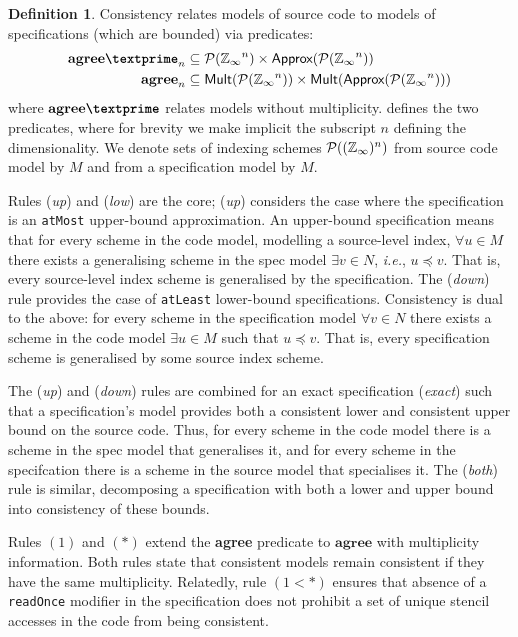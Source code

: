 \documentclass[10pt,preprint,numbers]{sigplanconf}
\newcounter{block}
\theoremstyle{definition}
\newtheorem{definition}[block]{Definition}
\newcommand{\ie}{\emph{i.e.}}
\newcommand{\term}[1]{\texttt{#1}}
\newcommand{\consName}{\textbf{agree\textprime}}
\newcommand{\consAName}{\textbf{agree}}
\begin{document}
\begin{definition}
Consistency relates models of source code to models
of specifications (which are bounded) via predicates:
\begin{align*}
\consName_n & \subseteq \mathcal{P}(\domainVal{}^n)
\times \textsf{Approx}(\mathcal{P}(\domainVal{}^n)) \\
\consAName_n & \subseteq \textsf{Mult}(\mathcal{P}(\domainVal{}^n))
\times \textsf{Mult}(\textsf{Approx}(\mathcal{P}(\domainVal{}^n)))
\end{align*}
%
where $\consName$ relates models without multiplicity.
 defines the two predicates, where for
brevity we make implicit the subscript $n$ defining the
dimensionality.  We denote sets of indexing schemes
$\mathcal{P}((\mathbb{Z}_\infty{})^n)$
from source code model by $M$ and from a specification model by $M$.

Rules (\emph{up}) and (\emph{low}) are the core; (\emph{up})
considers the case where the specification is
an \term{atMost} upper-bound approximation.
An upper-bound specification means that for every scheme in the code
model, modelling a source-level index, $\forall u \in M$ there exists
a generalising scheme in the spec model $\exists v \in N$, \ie{}, $u
\preceq v$. That is, every source-level index scheme is generalised by the specification.
The (\emph{down}) rule provides the case of
\term{atLeast} lower-bound specifications. Consistency is dual to the above:
for every scheme in the specification model $\forall v \in N$ there
exists a scheme in the code model $\exists u \in M$ such that $u
\preceq v$. That is, every specification scheme is generalised by some source
index scheme.

The (\emph{up}) and (\emph{down}) rules are combined for an \textsf{exact}
specification (\textit{exact}) such that a specification's model
provides both a consistent lower and consistent upper bound on
the source code. Thus, for every scheme in the code model there
is a scheme in the spec model that generalises it, and for every
scheme in the specifcation there is a scheme in the source model that
specialises it.  The (\textit{both}) rule is similar, decomposing
a specification with both a lower and upper bound into
consistency of these bounds.

Rules $(1)$ and $(*)$ extend the \consName{}
predicate to $\consAName{}$ with
multiplicity information. Both rules
state that consistent models remain consistent if they
have the same multiplicity. Relatedly, rule $(1 < *)$ ensures
that absence of a \texttt{readOnce} modifier in the specification
does not prohibit a set of unique stencil accesses in the
code from being consistent.
\end{definition}
\end{document}
